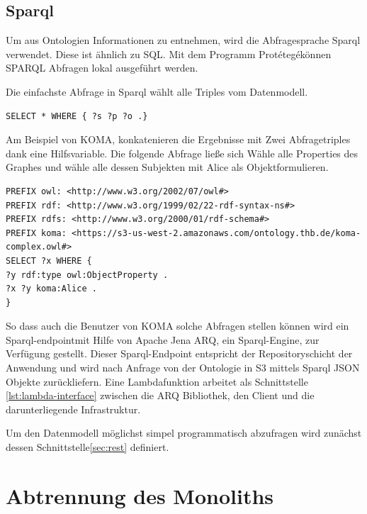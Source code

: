 \documentclass[
12pt,
english,
ngerman,
headsepline,
twoside,
openright,
numbers=noenddot,version=first
]{scrreprt}
\begin{document}
\subsection{Sparql}
Um aus Ontologien Informationen zu entnehmen, wird die Abfragesprache \acrfull{Sparql} 
verwendet. Diese ist ähnlich zu SQL. Mit dem Programm \glqq Protétegé\grqq können SPARQL Abfragen lokal ausgeführt werden.

Die einfachste Abfrage in Sparql wählt alle Triples vom Datenmodell.

\begin{lstlisting}[language=Sparql]
SELECT * WHERE { ?s ?p ?o .}
\end{lstlisting}

Am Beispiel von KOMA, konkatenieren die Ergebnisse mit Zwei Abfragetriples dank eine Hilfsvariable. Die folgende Abfrage ließe sich \glqq Wähle alle Properties des Graphes und wähle alle dessen Subjekten mit Alice als Objekt\grqq formulieren. \\
\begin{lstlisting}
PREFIX owl: <http://www.w3.org/2002/07/owl#>
PREFIX rdf: <http://www.w3.org/1999/02/22-rdf-syntax-ns#>
PREFIX rdfs: <http://www.w3.org/2000/01/rdf-schema#>
PREFIX koma: <https://s3-us-west-2.amazonaws.com/ontology.thb.de/koma-complex.owl#>
SELECT ?x WHERE {
?y rdf:type owl:ObjectProperty .
?x ?y koma:Alice .
}
\end{lstlisting}

So dass auch die Benutzer von \acrshort{KOMA} solche Abfragen stellen können wird ein \glqq Sparql-endpoint\grqq mit Hilfe von Apache Jena ARQ, ein Sparql-Engine, zur Verfügung gestellt. 
Dieser Sparql-Endpoint entspricht der Repositoryschicht der Anwendung und wird nach Anfrage von der Ontologie in S3 mittels Sparql JSON Objekte zurückliefern.
Eine Lambdafunktion arbeitet als Schnittstelle \ref{lst:lambda-interface} zwischen die ARQ Bibliothek, den Client und die darunterliegende Infrastruktur.


Um den Datenmodell möglichst simpel programmatisch abzufragen wird zunächst dessen Schnittstelle\ref{sec:rest} definiert. 


\section{Abtrennung des Monoliths}
\end{document}
